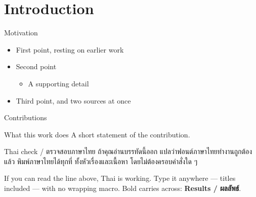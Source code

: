 
\section{Introduction}

\begin{frame}{Motivation}
  \begin{itemize}
    \item First point, resting on earlier work \cite{example2024}
    \item Second point
      \begin{itemize}
        \item A supporting detail
      \end{itemize}
    \item Third point, and two sources at once \cite{example2024,sample2023}
  \end{itemize}

\end{frame}

\begin{frame}{Contributions}
  \begin{block}{What this work does}
    A short statement of the contribution.
  \end{block}
\end{frame}

\begin{frame}{Thai check / ตรวจสอบภาษาไทย}
  ถ้าคุณอ่านบรรทัดนี้ออก แปลว่าฟอนต์ภาษาไทยทำงานถูกต้องแล้ว
  พิมพ์ภาษาไทยได้ทุกที่ ทั้งหัวเรื่องและเนื้อหา โดยไม่ต้องครอบคำสั่งใด ๆ

  \vspace{0.4em}
  If you can read the line above, Thai is working. Type it anywhere ---
  titles included --- with no wrapping macro. Bold carries across:
  \textbf{Results / ผลลัพธ์}.
\end{frame}
